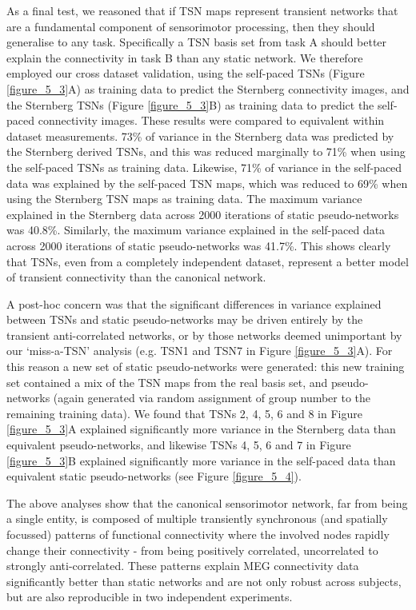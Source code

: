 As a final test, we reasoned that if TSN maps represent transient networks that are a fundamental component of sensorimotor processing, then they should generalise to any task. Specifically a TSN basis set from task A should better explain the connectivity in task B than any static network. We therefore employed our cross dataset validation, using the self-paced TSNs (Figure \ref{figure_5_3}A) as training data to predict the Sternberg connectivity images, and the Sternberg TSNs (Figure \ref{figure_5_3}B) as training data to predict the self-paced connectivity images. These results were compared to equivalent within dataset measurements.  73\% of variance in the Sternberg data was predicted by the Sternberg derived TSNs, and this was reduced marginally to 71\% when using the self-paced TSNs as training data. Likewise, 71\% of variance in the self-paced data was explained by the self-paced TSN maps, which was reduced to  69\% when using the Sternberg TSN maps as training data. The maximum variance explained in the Sternberg data across 2000 iterations of static pseudo-networks was 40.8\%. Similarly, the maximum variance explained in the self-paced data across 2000 iterations of static pseudo-networks was 41.7\%. This shows clearly that TSNs, even from a completely independent dataset, represent a better model of transient connectivity than the canonical network. 

A post-hoc concern was that the significant differences in variance explained between TSNs and static pseudo-networks may be driven entirely by the transient anti-correlated networks, or by those networks deemed unimportant by our ‘miss-a-TSN’ analysis (e.g. TSN1 and TSN7 in Figure \ref{figure_5_3}A). For this reason a new set of static pseudo-networks were generated: this new training set contained a mix of the TSN maps from the real basis set, and pseudo-networks (again generated via random assignment of group number to the remaining training data). We found that TSNs 2, 4, 5, 6 and 8 in Figure \ref{figure_5_3}A explained significantly more variance in the Sternberg data than equivalent pseudo-networks, and likewise TSNs 4, 5, 6 and 7 in Figure \ref{figure_5_3}B explained significantly more variance in the self-paced data than equivalent static pseudo-networks (see Figure \ref{figure_5_4}). 

The above analyses show that the canonical sensorimotor network, far from being a single entity, is composed of multiple transiently synchronous (and spatially focussed) patterns of functional connectivity where the involved nodes rapidly change their connectivity - from being positively correlated, uncorrelated to strongly anti-correlated. These patterns explain MEG connectivity data significantly better than static networks and are not only robust across subjects, but are also reproducible in two independent experiments.
\clearpage


